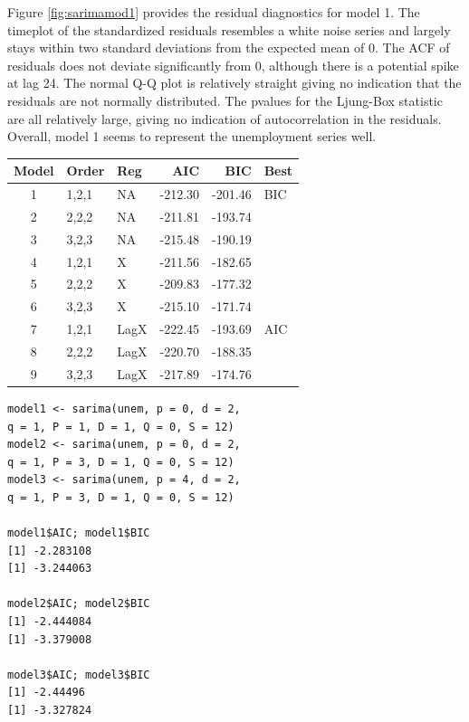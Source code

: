 \documentclass[twoside,twocolumn]{article}
\begin{document}
Figure \ref{fig:sarimamod1} provides the residual diagnostics for model 1. The timeplot of the standardized residuals resembles a white noise series and largely stays within two standard deviations from the expected mean of 0.  The ACF of residuals does not deviate significantly from 0, although there is a potential spike at lag 24. The normal Q-Q plot is relatively straight giving no indication that the residuals are not normally distributed. The pvalues for the Ljung-Box statistic are all relatively large, giving no indication of autocorrelation in the residuals.  Overall, model 1 seems to represent the unemployment series well.


\begin{table}[ht]
\centering
\begin{tabular}{cllrrl}
  \hline
 Model & Order & Reg  & AIC & BIC & Best \\ 
  \hline
1 & 1,2,1 &  NA &   -212.30 & -201.46 & BIC \\ 
  2  & 2,2,2 & NA   & -211.81 & -193.74 &  \\ 
  3  & 3,2,3 &  NA  & -215.48 & -190.19 &  \\ 
  4  & 1,2,1 & X  & -211.56 & -182.65 &  \\ 
  5  & 2,2,2 & X   & -209.83 & -177.32 &  \\ 
  6  & 3,2,3 & X   & -215.10 & -171.74 &  \\ 
  7  & 1,2,1 &  LagX & -222.45 & -193.69 & AIC \\ 
  8  & 2,2,2 &  LagX & -220.70 & -188.35 &  \\ 
  9  & 3,2,3 &  LagX & -217.89 & -174.76 &  \\ 
   \hline
\end{tabular}
\end{table}



\begin{verbatim}
model1 <- sarima(unem, p = 0, d = 2, 
q = 1, P = 1, D = 1, Q = 0, S = 12)
model2 <- sarima(unem, p = 0, d = 2, 
q = 1, P = 3, D = 1, Q = 0, S = 12)
model3 <- sarima(unem, p = 4, d = 2, 
q = 1, P = 3, D = 1, Q = 0, S = 12)

model1$AIC; model1$BIC
[1] -2.283108
[1] -3.244063

model2$AIC; model2$BIC
[1] -2.444084
[1] -3.379008

model3$AIC; model3$BIC
[1] -2.44496
[1] -3.327824
\end{verbatim}
\end{document}
